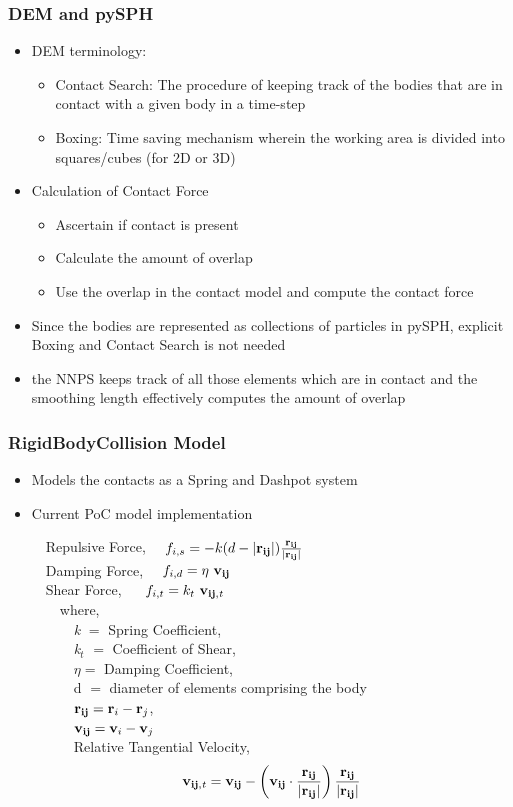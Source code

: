 \documentclass{beamer}
\begin{document}
 \begin{frame} %
 \frametitle{DEM and pySPH}
 \begin{itemize}
  \item DEM terminology:
  \begin{itemize}
   \item Contact Search: The procedure of keeping track of the bodies that are in contact with a given body in a time-step
   \item Boxing: Time saving mechanism wherein the working area is divided into squares/cubes (for 2D or 3D)
  \end{itemize}
  \item Calculation of Contact Force
  \begin{itemize}
   \item Ascertain if contact is present
   \item Calculate the amount of overlap
   \item Use the overlap in the contact model and compute the contact force
  \end{itemize}
  \item Since the bodies are represented as collections of particles in pySPH, explicit Boxing and Contact Search is not needed
  \item the NNPS keeps track of all those elements which are in contact and the smoothing length effectively computes the amount of overlap  
 \end{itemize}
 \end{frame}
%
 \begin{frame} %
  \frametitle{RigidBodyCollision Model}
  \begin{itemize}
  \item Models the 	contacts as a Spring and Dashpot system \pause
  \item Current PoC model implementation
  
   ~~Repulsive Force, ~~$f_{i,s} = -k(d-|{\bf{r_{ij}}}|)\frac{{\bf{r_{ij}}}}{|{\bf{r_{ij}}}|}$ \\
    ~~Damping Force, ~~$f_{i,d} = \eta ~ {\bf{v_{ij}}}$ \\ 
    ~~Shear Force, ~~ $f_{i,t} = k_{t} ~ {\bf{v_{ij,{\it{t}}}}}$\\
    ~~~~where, \\
    ~~~~~~{\it{k}} $=$ Spring Coefficient, \\
    ~~~~~~{\it{k$_t$}} $=$ Coefficient of Shear, \\
    ~~~~~~$\eta =$ Damping Coefficient,\\
    ~~~~~~d $=$ diameter of elements comprising the body\\ 
    ~~~~~~${\bf{r_{ij}}} = \textbf{r}_{i} - \textbf{r}_{j}$,\\
    ~~~~~~${\bf{v_{ij}}} =\textbf{v}_{i} - \textbf{v}_{j} $ \\
    ~~~~~~Relative Tangential Velocity, $${\bf{v_{ij,{\it{t}}}}} = {\bf{v_{ij}}} - \left({\bf{v_{ij}}} \cdot \frac{{\bf{r_{ij}}}}{|{\bf{r_{ij}}}|}\right) \frac{{\bf{r_{ij}}}}{|{\bf{r_{ij}}}|} $$\\
  \end{itemize}
 \end{frame}
\end{document}
